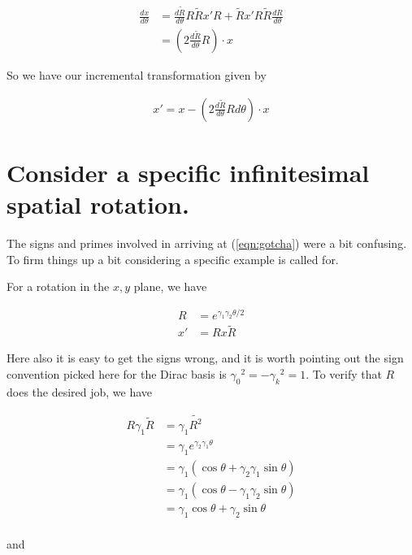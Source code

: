 \begin{align*}
\frac{dx}{d\theta}
&= \frac{d \tilde{R}}{d\theta} R \tilde{R} x' R + \tilde{R} x' R \tilde{R} \frac{d {R}}{d\theta}  \\
&= \left(2 \frac{d \tilde{R}}{d\theta} R \right) \cdot x
\end{align*}

So we have our incremental transformation given by

\begin{align}\label{eqn:gotcha}
x'= x - \left(2 \frac{d \tilde{R}}{d\theta} R d\theta \right) \cdot x
\end{align}


\section{Consider a specific infinitesimal spatial rotation.}

The signs and primes involved in arriving at (\ref{eqn:gotcha}) were a bit confusing.  To firm things
up a bit considering a specific example is called for.

For a rotation in the $x,y$ plane, we have

\begin{align}
R &= e^{\gamma_1 \gamma_2 \theta/2} \\
x' &= R x \tilde{R}
\end{align}

Here also it is easy to get the signs wrong, and it is worth pointing out the sign convention picked here for the Dirac basis is ${\gamma_0}^2 = -{\gamma_k}^2 = 1$.  To verify that $R$ does the desired job, we have

\begin{align*}
R \gamma_1 \tilde{R}
&=
\gamma_1 \tilde{R^2} \\
&=
\gamma_1 e^{\gamma_2 \gamma_1 \theta} \\
&=
\gamma_1 (\cos\theta + \gamma_2 \gamma_1 \sin\theta) \\
&=
\gamma_1 (\cos\theta - \gamma_1 \gamma_2 \sin\theta) \\
&=
\gamma_1 \cos\theta + \gamma_2 \sin\theta \\
\end{align*}

and 

